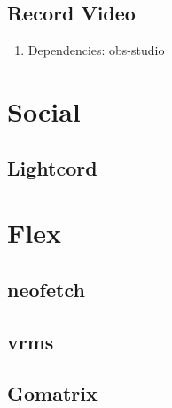 \documentclass[10pt, a4paper, onecolumn, openany]{book} %
\begin{document}
\subsection{Record Video}
\begin{enumerate}
    \item Dependencies: obs-studio
\end{enumerate}
\section{Social}
\subsection{Lightcord}
\section{Flex}
\subsection{neofetch}
\subsection{vrms}
\subsection{Gomatrix}
\end{document}
